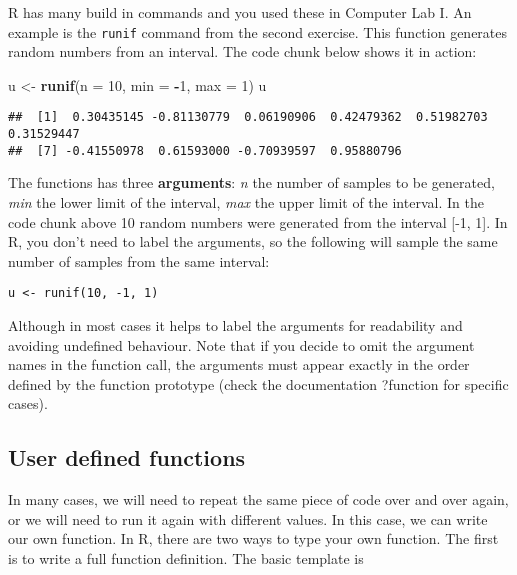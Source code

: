 \documentclass[
]{book}
\newenvironment{Shaded}{\begin{snugshade}}{\end{snugshade}}
\newcommand{\AttributeTok}[1]{\textcolor[rgb]{0.13,0.29,0.53}{#1}}
\newcommand{\DecValTok}[1]{\textcolor[rgb]{0.00,0.00,0.81}{#1}}
\newcommand{\FunctionTok}[1]{\textcolor[rgb]{0.13,0.29,0.53}{\textbf{#1}}}
\newcommand{\NormalTok}[1]{#1}
\newcommand{\OtherTok}[1]{\textcolor[rgb]{0.56,0.35,0.01}{#1}}
\newcommand{\SpecialCharTok}[1]{\textcolor[rgb]{0.81,0.36,0.00}{\textbf{#1}}}
\theoremstyle{definition}
\theoremstyle{definition}
\theoremstyle{definition}
\theoremstyle{definition}
\theoremstyle{remark}
\begin{document}
R has many build in commands and you used these in Computer Lab I. An example is the \texttt{runif} command from the second exercise. This function generates random numbers from an interval. The code chunk below shows it in action:

\begin{Shaded}
\begin{Highlighting}[]
\NormalTok{u }\OtherTok{\textless{}{-}} \FunctionTok{runif}\NormalTok{(}\AttributeTok{n =} \DecValTok{10}\NormalTok{, }\AttributeTok{min =} \SpecialCharTok{{-}}\DecValTok{1}\NormalTok{, }\AttributeTok{max =} \DecValTok{1}\NormalTok{)}
\NormalTok{u}
\end{Highlighting}
\end{Shaded}

\begin{verbatim}
##  [1]  0.30435145 -0.81130779  0.06190906  0.42479362  0.51982703  0.31529447
##  [7] -0.41550978  0.61593000 -0.70939597  0.95880796
\end{verbatim}

The functions has three \textbf{arguments}: \emph{n} the number of samples to be generated, \emph{min} the lower limit of the interval, \emph{max} the upper limit of the interval. In the code chunk above 10 random numbers were generated from the interval {[}-1, 1{]}. In R, you don't need to label the arguments, so the following will sample the same number of samples from the same interval:

\begin{verbatim}
u <- runif(10, -1, 1)
\end{verbatim}

Although in most cases it helps to label the arguments for readability and avoiding undefined behaviour. Note that if you decide to omit the argument names in the function call, the arguments must appear exactly in the order defined by the function prototype (check the documentation ?function for specific cases).

\hypertarget{user-defined-functions}{%
\subsection{User defined functions}\label{user-defined-functions}}

In many cases, we will need to repeat the same piece of code over and over again, or we will need to run it again with different values. In this case, we can write our own function. In R, there are two ways to type your own function. The first is to write a full function definition. The basic template is
\end{document}
